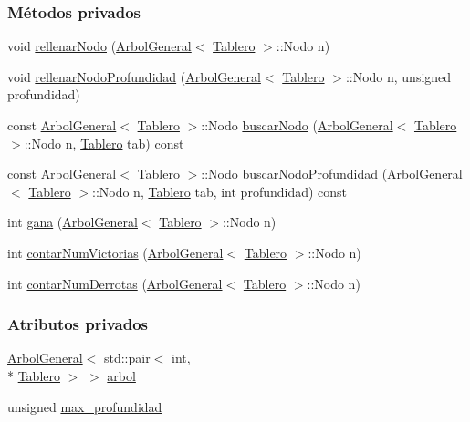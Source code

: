 \subsubsection*{Métodos privados}
\begin{DoxyCompactItemize}
\item 
void \hyperlink{classJugadorAuto_ae90fa3f90f9f0357a1e04512e1352f80}{rellenar\-Nodo} (\hyperlink{classArbolGeneral}{Arbol\-General}$<$ \hyperlink{classTablero}{Tablero} $>$\-::Nodo n)
\item 
void \hyperlink{classJugadorAuto_add87179bcda9c297dfe06ca327a3de84}{rellenar\-Nodo\-Profundidad} (\hyperlink{classArbolGeneral}{Arbol\-General}$<$ \hyperlink{classTablero}{Tablero} $>$\-::Nodo n, unsigned profundidad)
\item 
const \hyperlink{classArbolGeneral}{Arbol\-General}$<$ \hyperlink{classTablero}{Tablero} $>$\-::Nodo \hyperlink{classJugadorAuto_ace20f5c31c291f99491df06b356ae37d}{buscar\-Nodo} (\hyperlink{classArbolGeneral}{Arbol\-General}$<$ \hyperlink{classTablero}{Tablero} $>$\-::Nodo n, \hyperlink{classTablero}{Tablero} tab) const 
\item 
const \hyperlink{classArbolGeneral}{Arbol\-General}$<$ \hyperlink{classTablero}{Tablero} $>$\-::Nodo \hyperlink{classJugadorAuto_aeeda871eb999ffc3e9d4a87cdcc01e7d}{buscar\-Nodo\-Profundidad} (\hyperlink{classArbolGeneral}{Arbol\-General}$<$ \hyperlink{classTablero}{Tablero} $>$\-::Nodo n, \hyperlink{classTablero}{Tablero} tab, int profundidad) const 
\item 
int \hyperlink{classJugadorAuto_ac549b60abbbae7245321cf7436382de6}{gana} (\hyperlink{classArbolGeneral}{Arbol\-General}$<$ \hyperlink{classTablero}{Tablero} $>$\-::Nodo n)
\item 
int \hyperlink{classJugadorAuto_a79ebbd4001280b8d81f1bdb8376214e5}{contar\-Num\-Victorias} (\hyperlink{classArbolGeneral}{Arbol\-General}$<$ \hyperlink{classTablero}{Tablero} $>$\-::Nodo n)
\item 
int \hyperlink{classJugadorAuto_a131bba1aecfc13b5fc16f3f287fb5f42}{contar\-Num\-Derrotas} (\hyperlink{classArbolGeneral}{Arbol\-General}$<$ \hyperlink{classTablero}{Tablero} $>$\-::Nodo n)
\end{DoxyCompactItemize}
\subsubsection*{Atributos privados}
\begin{DoxyCompactItemize}
\item 
\hyperlink{classArbolGeneral}{Arbol\-General}$<$ std\-::pair$<$ int, \\*
\hyperlink{classTablero}{Tablero} $>$ $>$ \hyperlink{classJugadorAuto_a84a871bd25126b171004ec0967826332}{arbol}
\item 
unsigned \hyperlink{classJugadorAuto_a442a2ba01ebcc71283833176e214b7d3}{max\-\_\-profundidad}
\end{DoxyCompactItemize}


